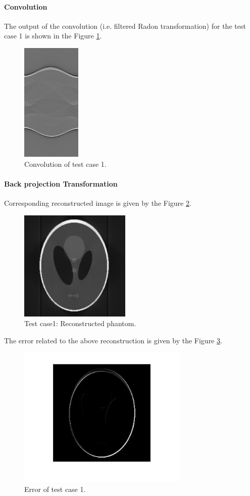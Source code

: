 \paragraph{Convolution}
The output of the convolution (i.e. filtered Radon transformation) for the test case 1 is shown in the Figure \ref{fig:cont1}.  
\begin{figure}[H]
	\centering
		\includegraphics[width=80pt]{Figures/Convolution256.jpg}
	\caption[Convolution of test case 1.]{Convolution of test case 1.}
	\label{fig:cont1}
\end{figure}

\paragraph{Back projection Transformation}
Corresponding reconstructed image is given by the Figure \ref{fig:t1}.  
\begin{figure}[H]
	\centering
		\includegraphics[width=150pt]{Figures/ReconstructedImage256.jpg}
	\caption[Test case 1 image.]{Test case1: Reconstructed phantom.}
	\label{fig:t1}
\end{figure}

The error related to the above reconstruction is given by the Figure \ref{fig:error}.  
\begin{figure}[H]
	\centering
		\includegraphics[width=230pt]{Figures/error.jpg}
	\caption[Reconstruction error image.]{Error of test case 1.}
	\label{fig:error}
\end{figure}

